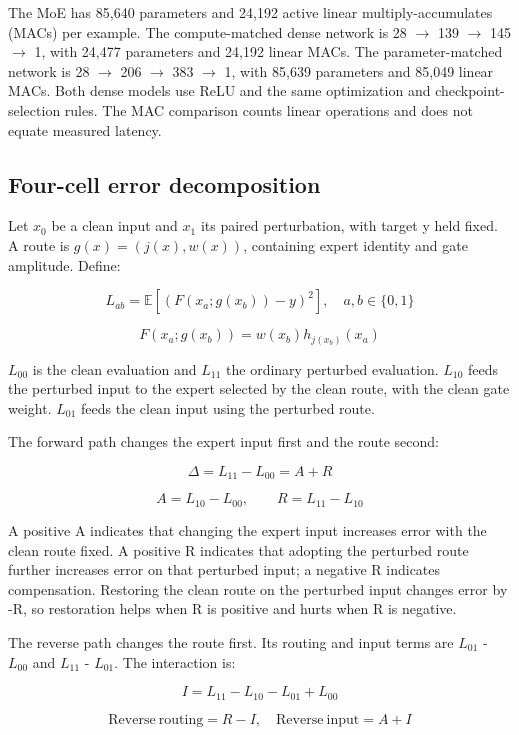 \documentclass[10pt,letterpaper]{article}
\begin{document}
The MoE has 85,640 parameters and 24,192 active linear multiply-accumulates (MACs) per example. The compute-matched dense network is 28 \ensuremath{\rightarrow} 139 \ensuremath{\rightarrow} 145 \ensuremath{\rightarrow} 1, with 24,477 parameters and 24,192 linear MACs. The parameter-matched network is 28 \ensuremath{\rightarrow} 206 \ensuremath{\rightarrow} 383 \ensuremath{\rightarrow} 1, with 85,639 parameters and 85,049 linear MACs. Both dense models use ReLU and the same optimization and checkpoint-selection rules. The MAC comparison counts linear operations and does not equate measured latency.


\subsection{Four-cell error decomposition}

Let $x_{0}$ be a clean input and $x_{1}$ its paired perturbation, with target y held fixed. A route is $g(x)=(j(x),w(x))$, containing expert identity and gate amplitude. Define:


\[
L_{ab}=\mathbb{E}[(F(x_a;g(x_b))-y)^2],\quad a,b\in\{0,1\}
\]

\[
F(x_a;g(x_b))=w(x_b)h_{j(x_b)}(x_a)
\]

$L_{00}$ is the clean evaluation and $L_{11}$ the ordinary perturbed evaluation. $L_{10}$ feeds the perturbed input to the expert selected by the clean route, with the clean gate weight. $L_{01}$ feeds the clean input using the perturbed route.


The forward path changes the expert input first and the route second:


\[
\Delta=L_{11}-L_{00}=A+R
\]

\[
A=L_{10}-L_{00},\qquad R=L_{11}-L_{10}
\]

A positive A indicates that changing the expert input increases error with the clean route fixed. A positive R indicates that adopting the perturbed route further increases error on that perturbed input; a negative R indicates compensation. Restoring the clean route on the perturbed input changes error by -R, so restoration helps when R is positive and hurts when R is negative.


The reverse path changes the route first. Its routing and input terms are $L_{01}$ - $L_{00}$ and $L_{11}$ - $L_{01}$. The interaction is:


\[
I=L_{11}-L_{10}-L_{01}+L_{00}
\]

\[
\mathrm{Reverse\ routing}=R-I,\quad\mathrm{Reverse\ input}=A+I
\]
\end{document}
